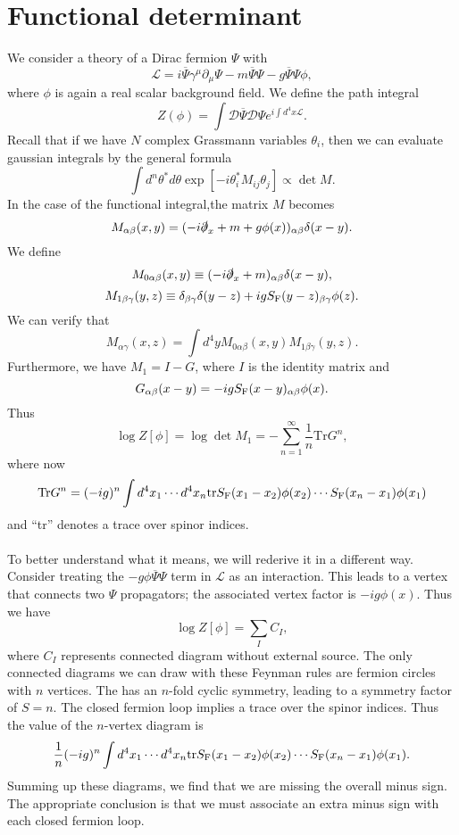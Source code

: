 \section{Functional determinant}
We consider a theory of a Dirac fermion $\Psi$ with
\[\mathcal{L} = i\overline{\Psi} \gamma^{\mu} \partial_{\mu} \Psi - m\overline{\Psi}\Psi -g \overline{\Psi}\Psi\phi,\]
where $\phi$ is again a real scalar background field. We define the path integral
\[Z(\phi) = \int \mathcal{D}\overline{\Psi}\mathcal{D}\Psi e^{i\int d^4x \mathcal{L}} .\]
Recall that if we have $N$ complex Grassmann variables $\theta_i$, then we can evaluate gaussian integrals by the general formula
\[\int d^n\theta^* d\theta \exp[-i\theta^{*}_i M_{ij}\theta_j] \propto \det M.\]
In the case of the functional integral,the matrix $M$ becomes
\[M_{\alpha\beta}(x,y) = (-i\slashed{\partial}_x + m + g\phi(x))_{\alpha\beta}\delta(x-y).\]
We define
\[M_{0\alpha\beta}(x,y) \equiv (-i\slashed{\partial}_x + m )_{\alpha\beta}\delta(x-y),\]
\[M_{1\beta\gamma}(y,z) \equiv \delta_{\beta\gamma}\delta(y-z) + igS_{\rm F}(y-z)_{\beta\gamma}\phi(z).\]
We can verify that
\[M_{\alpha\gamma}(x,z) = \int d^4y M_{0\alpha\beta}(x,y)M_{1\beta\gamma}(y,z) .\]
Furthermore, we have $M_1 = I - G$, where $I$ is the identity matrix and
\[G_{\alpha\beta}(x-y) = -igS_{\rm F}(x-y)_{\alpha\beta}\phi(x).\]
Thus
\[\log Z[\phi] = \log \det M_1 = -\sum_{n=1}^{\infty} \frac{1}{n} \mathrm{Tr}G^n,\]
where now
\[\mathrm{Tr}G^n = (-ig)^n \int d^4x_1 \cdots d^4x_n \mathrm{tr} S_{\rm F}(x_1-x_2)\phi(x_2) \cdots S_{\rm F}(x_n-x_1)\phi(x_1)\]
and ``tr'' denotes a trace over spinor indices.
\\ \\
To better understand what it means, we will rederive it in a different way. 
Consider treating the $-g\phi\overline{\Psi}\Psi$ term in $\mathcal{L}$ as an interaction. This leads to a vertex that connects two $\Psi$ propagators; the associated vertex factor
is $-ig\phi(x)$. 
Thus we have
\[\log Z[\phi] = \sum_{I}C_I,\]
where $C_I$ represents connected diagram without external source. The only connected diagrams we can draw with these Feynman rules are fermion circles with $n$ vertices. 
The has an $n$-fold cyclic symmetry, leading to a symmetry factor of $S= n$. The closed fermion loop implies a trace over the spinor indices. Thus the value of the $n$-vertex diagram is
\[\frac{1}{n}(-ig)^n \int d^4x_1 \cdots d^4x_n \mathrm{tr} S_{\rm F}(x_1-x_2)\phi(x_2) \cdots S_{\rm F}(x_n-x_1)\phi(x_1).\]
Summing up these diagrams, we find that we are missing the overall minus sign. The appropriate conclusion is that we must associate an extra minus sign with each closed fermion loop.
